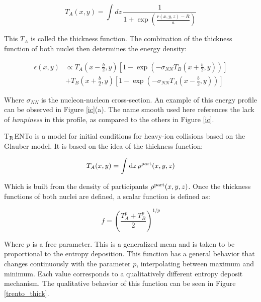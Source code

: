 \begin{equation}
T_A(x,y) = \int dz \, \frac{1}{1+\exp(\frac{r(x,y,z)-R}{a})}
\end{equation}

This $T_A$ is called the thickness function. The combination of the thickness function of both nuclei then determines the energy density:


\begin{equation}
\begin{split}
\epsilon (x,y) &\propto T_A(x-\frac{b}{2},y) \left[ 1 - \exp \left( - \sigma_{NN} T_B(x+\frac{b}{2},y) \right) \right] \\ & + T_B(x+\frac{b}{2},y) \left[ 1 - \exp \left( - \sigma_{NN} T_A(x-\frac{b}{2},y) \right) \right]
\end{split}
\end{equation}

Where $\sigma_{NN}$ is the nucleon-nucleon cross-section. An example of this energy profile can be observed in Figure \ref{ic}(a). The name smooth used here references the lack of \emph{lumpiness} in this profile, as compared to the others in Figure \ref{ic}.

 \label{trento}

T$_{\rm R}$ENTo\cite{moreland_alternative_2015} is a model for initial conditions for heavy-ion collisions based on the Glauber model. It is based on the idea of the thickness function:

\begin{equation}
T_A (x,y) = \int {\rm d}z \, \rho^{\rm part} (x,y,z)
\end{equation}

Which is built from the density of participants $\rho^{\rm part} (x,y,z)$. Once the thickness functions of both nuclei are defined, a scalar function is defined as:

\begin{equation}
f = \left( \frac{T^p_A+T^p_B}{2} \right)^{1/p}
\end{equation}

Where $p$ is a free parameter. This is a generalized mean and is taken to be proportional to the entropy deposition. This function has a general behavior that changes continuously with the parameter $p$, interpolating between maximum and minimum. Each value corresponds to a qualitatively different entropy deposit mechanism. The qualitative behavior of this function can be seen in Figure \ref{trento_thick}.

